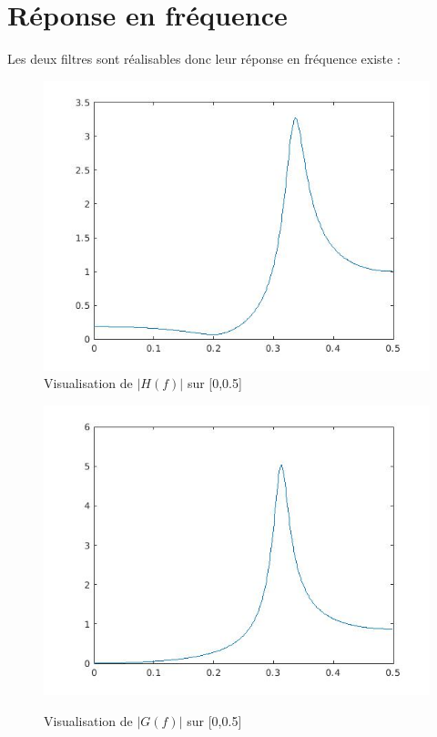 \documentclass[12,french]{report}
\begin{document}
\section{Réponse en fréquence}

Les deux filtres sont réalisables donc leur réponse en fréquence existe :\\


\begin{figure}[H]
    \begin{minipage}[c]{.50\linewidth}
        \centering
        \includegraphics[width=1\textwidth]{./Images/freqz_H}\\
        \caption{Visualisation de $|H(f)|$ sur [0,0.5]}
    \end{minipage}
    \hfill%
    \begin{minipage}[c]{.50\linewidth}
        \centering
        \includegraphics[width=1\textwidth]{./Images/freqz_G}\\
        \caption{Visualisation de $|G(f)|$ sur [0,0.5]}
    \end{minipage}
\end{figure}\vspace{0.3cm}
\end{document}
